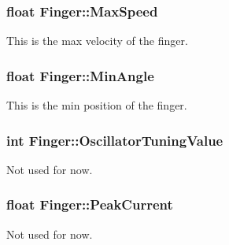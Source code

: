 \subsubsection[{\texorpdfstring{Max\+Speed}{MaxSpeed}}]{\setlength{\rightskip}{0pt plus 5cm}float Finger\+::\+Max\+Speed}\hypertarget{struct_finger_a66da8cea127f215c614fdb87e0ef2b9c}{}\label{struct_finger_a66da8cea127f215c614fdb87e0ef2b9c}


This is the max velocity of the finger. 

\subsubsection[{\texorpdfstring{Min\+Angle}{MinAngle}}]{\setlength{\rightskip}{0pt plus 5cm}float Finger\+::\+Min\+Angle}\hypertarget{struct_finger_a0dce6e32d94cfbad9313446c67138de0}{}\label{struct_finger_a0dce6e32d94cfbad9313446c67138de0}


This is the min position of the finger. 

\subsubsection[{\texorpdfstring{Oscillator\+Tuning\+Value}{OscillatorTuningValue}}]{\setlength{\rightskip}{0pt plus 5cm}int Finger\+::\+Oscillator\+Tuning\+Value}\hypertarget{struct_finger_ae77cb437b8a3225ec7012645df40aa48}{}\label{struct_finger_ae77cb437b8a3225ec7012645df40aa48}


Not used for now. 

\subsubsection[{\texorpdfstring{Peak\+Current}{PeakCurrent}}]{\setlength{\rightskip}{0pt plus 5cm}float Finger\+::\+Peak\+Current}\hypertarget{struct_finger_a1a0e3b38fbeac4a9805448504e1cd537}{}\label{struct_finger_a1a0e3b38fbeac4a9805448504e1cd537}


Not used for now. 

